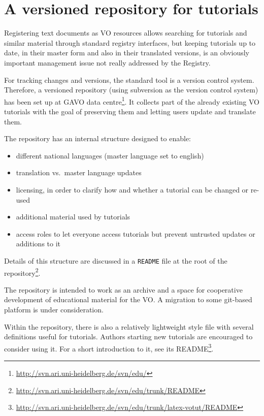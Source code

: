 \documentclass{ivoa}
\begin{document}
\section{A versioned repository for tutorials}

\label{sect:svn-repo}

Registering text documents as VO resources allows searching for tutorials
and similar
material through standard registry interfaces, but keeping
tutorials up to date, in their master form and also in their translated
versions, is an obviously important management issue not really
addressed by the Registry.

For tracking changes and versions, the standard tool is a version
control system.  Therefore,
a versioned repository (using subversion as the version control system)
has been set up at GAVO data
centre\footnote{\url{http://svn.ari.uni-heidelberg.de/svn/edu/}}.
It collects part of the
already existing VO tutorials with the goal of preserving them and
letting users
update and translate them.

The repository has an internal structure designed to enable:

\begin{itemize}

\item different national languages (master language set to english){}

\item translation vs.~master language updates{}

\item licensing, in order to clarify how and whether a tutorial can be changed or re-used{}

\item additional material used by tutorials

\item access roles to let everyone access tutorials but prevent untrusted updates or additions to it

\end{itemize}

Details of this structure are discussed in a \texttt{README} file at the
root of the
repository\footnote{\url{http://svn.ari.uni-heidelberg.de/svn/edu/trunk/README}}.

The repository is intended to work as an archive and a space for cooperative
development of educational material for the VO.  A migration to some
git-based platform is under consideration.

Within the repository, there is also a relatively lightweight style file
with several definitions useful for tutorials.  Authors starting new
tutorials are encouraged to consider using it.  For a short introduction
to it, see its README\footnote{\url{http://svn.ari.uni-heidelberg.de/svn/edu/trunk/latex-votut/README}}.
\end{document}
